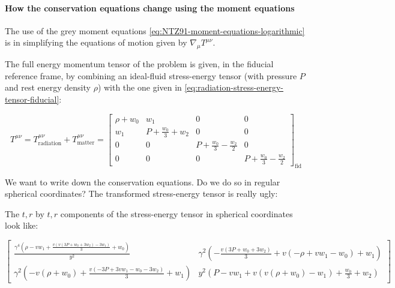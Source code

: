 \documentclass[main.tex]{subfiles}
\begin{document}
\paragraph{How the conservation equations change using the moment equations}

The use of the grey moment equations \eqref{eq:NTZ91-moment-equations-logarithmic} is in simplifying the equations of motion given by \(\nabla_\mu T^{\mu\nu}\).

The full energy momentum tensor of the problem is given, in the fiducial reference frame, by combining an ideal-fluid stress-energy tensor (with pressure \(P\) and rest energy density \(\rho\)) with the one given in \eqref{eq:radiation-stress-energy-tensor-fiducial}:

\begin{equation}
    T^{\mu\nu} =
    T^{\mu\nu}_{\text{radiation}} +
    T^{\mu\nu}_{\text{matter}} =
    \left[\begin{matrix}\rho + w_{0} & w_{1} & 0 & 0\\w_{1} & P + \frac{w_{0}}{3} + w_{2} & 0 & 0\\0 & 0 & P + \frac{w_{0}}{3} - \frac{w_{2}}{2} & 0\\0 & 0 & 0 & P + \frac{w_{0}}{3} - \frac{w_{2}}{2}\end{matrix}\right] _{\text{fid}}
\end{equation}

\begin{greenbox}
  We want to write down the conservation equations. Do we do so in regular spherical coordinates? The transformed stress-energy tensor is really ugly:
\end{greenbox}

The \(t,r\) by \(t, r\) components of the stress-energy tensor in spherical coordinates look like:

\begin{equation} \label{eq:spherical-coordinates-full-stress-energy-tensor}
      \left[
      \begin{matrix}
      \frac{\gamma^{4} \left(\rho - v w_{1} + \frac{v \left(v \left(3 P + w_{0} + 3 w_{2}\right) - 3 w_{1}\right)}{3} + w_{0}\right)}{y^{2}} &
      \gamma^{2} \left(- \frac{v \left(3 P + w_{0} + 3 w_{2}\right)}{3} + v \left(- \rho + v w_{1} - w_{0}\right) + w_{1}\right)\\
      \gamma^{2} \left(- v \left(\rho + w_{0}\right) + \frac{v \left(- 3 P + 3 v w_{1} - w_{0} - 3 w_{2}\right)}{3} + w_{1}\right) &
      y^{2} \left(P - v w_{1} + v \left(v \left(\rho + w_{0}\right) - w_{1}\right) + \frac{w_{0}}{3} + w_{2}\right)
    \end{matrix}
      \right]
\end{equation}
\end{document}
